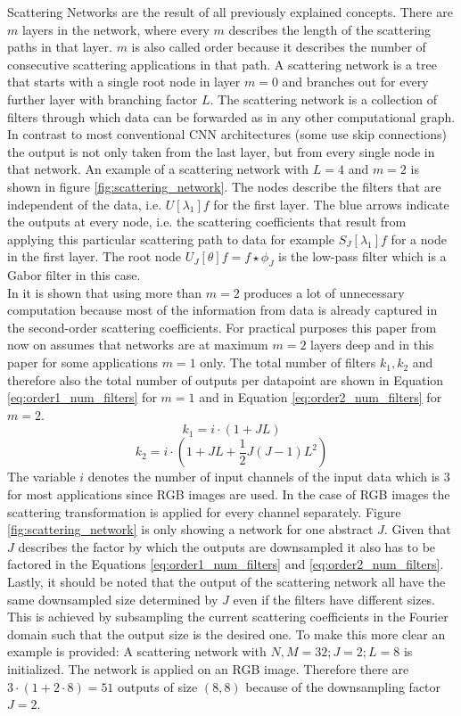 Scattering Networks are the result of all previously explained concepts. There are $m$ layers in the network, where every $m$ describes the length of the scattering paths in that layer. $m$ is also called order because it describes the number of consecutive scattering applications in that path. A scattering network is a tree that starts with a single root node in layer $m=0$ and branches out for every further layer with branching factor $L$. The scattering network is a collection of filters through which data can be forwarded as in any other computational graph. In contrast to most conventional CNN architectures (some use skip connections) the output is not only taken from the last layer, but from every single node in that network. An example of a scattering network with $L=4$ and $m=2$ is shown in figure \ref{fig:scattering_network}. The nodes describe the filters that are independent of the data, i.e. $U[\lambda_1]f$ for the first layer. The blue arrows indicate the outputs at every node, i.e. the scattering coefficients that result from applying this particular scattering path to data for example $S_J[\lambda_1]f$ for a node in the first layer. The root node $U_J[\theta]f = f \star \phi_J$ is the low-pass filter which is a Gabor filter in this case. \\
In \cite{scatteringTransform2012} it is shown that using more than $m=2$ produces a lot of unnecessary computation because most of the information from data is already captured in the second-order scattering coefficients. For practical purposes this paper from now on assumes that networks are at maximum $m=2$ layers deep and in this paper for some applications $m=1$ only. 
The total number of filters $k_1,k_2$ and therefore also the total number of outputs per datapoint are shown in Equation \ref{eq:order1_num_filters} for $m=1$ and in Equation \ref{eq:order2_num_filters} for $m=2$.
\begin{equation}
k_1 = i \cdot (1 + JL) 
\label{eq:order1_num_filters}
\end{equation} 
\begin{equation}
k_2 = i \cdot (1 + JL + \frac{1}{2}J(J-1)L^2)
\label{eq:order2_num_filters}
\end{equation}
The variable $i$ denotes the number of input channels of the input data which is 3 for most applications since RGB images are used. In the case of RGB images the scattering transformation is applied for every channel separately. Figure \ref{fig:scattering_network} is only showing a network for one abstract $J$. Given that $J$ describes the factor by which the outputs are downsampled it also has to be factored in the Equations \ref{eq:order1_num_filters} and \ref{eq:order2_num_filters}. Lastly, it should be noted that the output of the scattering network all have the same downsampled size determined by $J$ even if the filters have different sizes. This is achieved by subsampling the current scattering coefficients in the Fourier domain such that the output size is the desired one. To make this more clear an example is provided: A scattering network with $N,M = 32; J=2; L=8$ is initialized. The network is applied on an RGB image. Therefore there are $3 \cdot (1+2 \cdot 8) = 51$ outputs of size $(8,8)$ because of the downsampling factor $J=2$. 
